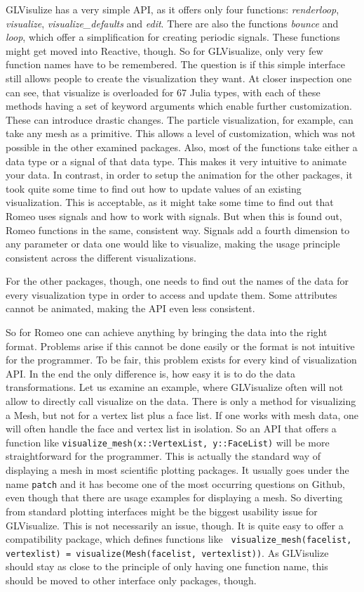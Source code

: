{GLVisulize has a very simple API, as it offers only four functions: \textit{renderloop}, \textit{visualize}, \textit{visualize\_defaults} and \textit{edit}.
There are also the functions \textit{bounce} and \textit{loop}, which offer a simplification for creating periodic signals.
These functions might get moved into Reactive, though.
So for GLVisualize, only very few function names have to be remembered.
The question is if this simple interface still allows people to create the visualization they want.
At closer inspection one can see, that visualize is overloaded for 67 Julia types, with each of these methods having a set of keyword arguments which enable further customization.
These can introduce drastic changes. The particle visualization, for example, can take any mesh as a primitive. This allows a level of customization, which was not possible in the other examined packages.
Also, most of the functions take either a data type or a signal of that data type.
This makes it very intuitive to animate your data. 
In contrast, in order to setup the animation for the other packages, it took quite some time to find out how to update values of an existing visualization. This is acceptable, as it might take some time to find out that Romeo uses signals and how to work with signals.
But when this is found out, Romeo functions in the same, consistent way. 
Signals add a fourth dimension to any parameter or data one would like to visualize, making the usage principle consistent across the different visualizations.

For the other packages, though, one needs to find out the names of the data for every visualization type in order to access and update them. Some attributes cannot be animated, making the API even less consistent.

So for Romeo one can achieve anything by bringing the data into the right format.
Problems arise if this cannot be done easily or the format is not intuitive for the programmer.
To be fair, this problem exists for every kind of visualization API.
In the end the only difference is, how easy it is to do the data transformations. 
Let us examine an example, where GLVisualize often will not allow to directly call visualize on the data.
There is only a method for visualizing a Mesh, but not for a vertex list plus a face list. 
If one works with mesh data, one will often handle the face and vertex list in isolation.
So an API that offers a function like \texttt{visualize\_mesh(x::VertexList, y::FaceList)} will be more straightforward for the programmer.
This is actually the standard way of displaying a mesh in most scientific plotting packages. It usually goes under the name \texttt{patch} and it has become one of the most occurring questions on Github, even though that there are usage examples for displaying a mesh.
So diverting from standard plotting interfaces might be the biggest usability issue for GLVisualize.
This is not necessarily an issue, though. 
It is quite easy to offer a compatibility package, which defines functions like \texttt{
visualize\_mesh(facelist, vertexlist) = visualize(Mesh(facelist, vertexlist))}.
As GLVisulize should stay as close to the principle of only having one function name, this should be moved to other interface only packages, though.

}
